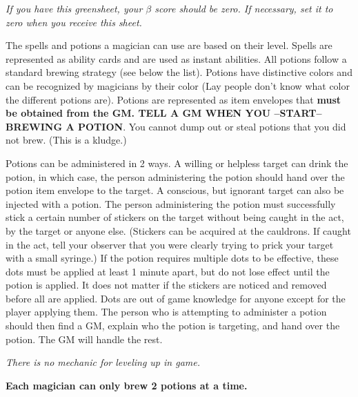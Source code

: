 \documentclass[green]{NeptuneBall}
\begin{document}
\name{\gPotions{}}

\emph{If you have this greensheet, your $\beta$ score should be zero. If necessary, set it to zero when you receive this sheet.}

The spells and potions a magician can use are based on their level. Spells are represented as ability cards and are used as instant abilities. All potions follow a standard brewing strategy (see below the list). Potions have distinctive colors and can be recognized by magicians by their color (Lay people don't know what color the different potions are). Potions are represented as item envelopes that {\bf must be obtained from the GM. TELL A GM WHEN YOU --START-- BREWING A POTION}. You cannot dump out or steal potions that you did not brew. (This is a kludge.)

Potions can be administered in 2 ways. A willing or helpless target can drink the potion, in which case, the person administering the potion should hand over the potion item envelope to the target. A conscious, but ignorant target can also be injected with a potion. The person administering the potion must successfully stick a certain number of stickers on the target without being caught in the act, by the target or anyone else. (Stickers can be acquired at the cauldrons. If caught in the act, tell your observer that you were clearly trying to prick your target with a small syringe.) If the potion requires multiple dots to be effective, these dots must be applied at least 1 minute apart, but do not lose effect until the potion is applied. It does not matter if the stickers are noticed and removed before all are applied. Dots are out of game knowledge for anyone except for the player applying them. The person who is attempting to administer a potion should then find a GM, explain who the potion is targeting, and hand over the potion. The GM will handle the rest.

\emph{There is no mechanic for leveling up in game.}

{\bf Each magician can only brew 2 potions at a time.} %
\end{document}
